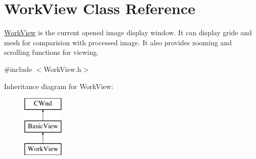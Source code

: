 \hypertarget{class_work_view}{}\section{Work\+View Class Reference}
\label{class_work_view}


\mbox{\hyperlink{class_work_view}{Work\+View}} is the current opened image display window. It can display gride and mesh for comparision with processed image. It also provides zooming and scrolling functions for viewing.  




{\ttfamily \#include $<$Work\+View.\+h$>$}

Inheritance diagram for Work\+View\+:\begin{figure}[H]
\begin{center}
\leavevmode
\includegraphics[height=3.000000cm]{class_work_view}
\end{center}
\end{figure}
